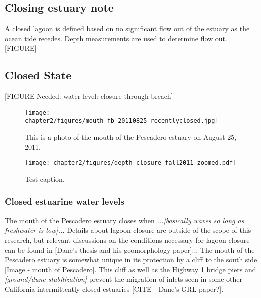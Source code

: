 \subsection{Closing estuary note} \label{closingest} A closed lagoon is
defined based on no significant flow out of the estuary as the ocean
tide recedes. Depth measurements are used to determine flow out.
[FIGURE]

\subsection{Closed State} \label{closed dynamics}


[FIGURE Needed: water level: closure through breach]

\begin{figure}
\texttt{[image: chapter2/figures/mouth\_fb\_20110825\_recentlyclosed.jpg]} \caption{This is a photo of the
mouth of the Pescadero estuary on August 25, 2011.}
\label{fig:mouth_fb_20110825} \end{figure}

\begin{figure}
\texttt{[image: chapter2/figures/depth\_closure\_fall2011\_zoomed.pdf]} \caption{Test caption.}
\label{fig:depthclosuref11} \end{figure}

\subsubsection{Closed estuarine water levels} \label{cl_wl}
The mouth of the Pescadero estuary closes when \emph{...[basically waves
so long as freshwater is low]...} Details about lagoon closure are
outside of the scope of this research, but relevant discussions on the
conditions necessary for lagoon closure can be found in [Dane's thesis
and his geomorphology paper]... The mouth of the Pescadero estuary is
somewhat unique in its protection by a cliff to the south side [Image -
mouth of Pescadero]. This cliff as well as the Highway 1 bridge piers
and \emph{[ground/dune stabilization]} prevent the migration of inlets
seen in some other California intermittently closed estuaries [CITE -
Dane's GRL paper?].


